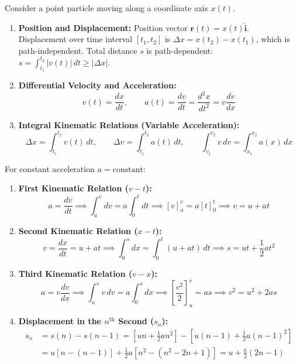 \documentclass[10pt,twoside,openright]{book}
\begin{document}
\begin{conceptbox}
Consider a point particle moving along a coordinate axis $x(t)$.
\begin{enumerate}[leftmargin=*]
  \item \textbf{Position and Displacement:} Position vector $\mathbf{r}(t) = x(t)\hat{\mathbf{i}}$. Displacement over time interval $[t_1, t_2]$ is $\Delta x = x(t_2) - x(t_1)$, which is path-independent. Total distance $s$ is path-dependent: $s = \int_{t_1}^{t_2} |v(t)|\,dt \ge |\Delta x|$.
  \item \textbf{Differential Velocity and Acceleration:}
  \begin{equation}
    v(t) = \frac{dx}{dt}, \qquad a(t) = \frac{dv}{dt} = \frac{d^2 x}{dt^2} = v\frac{dv}{dx}
  \end{equation}
  \item \textbf{Integral Kinematic Relations (Variable Acceleration):}
  \begin{equation}
    \Delta x = \int_{t_1}^{t_2} v(t)\,dt, \qquad \Delta v = \int_{t_1}^{t_2} a(t)\,dt, \qquad \int_{v_1}^{v_2} v\,dv = \int_{x_1}^{x_2} a(x)\,dx
  \end{equation}
\end{enumerate}
\end{conceptbox}

\begin{formulabox}
For constant acceleration $a = \text{constant}$:
\begin{enumerate}[leftmargin=*]
  \item \textbf{First Kinematic Relation ($v - t$):}
  \begin{equation}
    a = \frac{dv}{dt} \implies \int_{u}^{v} dv = a\int_{0}^{t} dt \implies [v]_u^v = a[t]_0^t \implies v = u + at
  \end{equation}
  \item \textbf{Second Kinematic Relation ($x - t$):}
  \begin{equation}
    v = \frac{dx}{dt} = u + at \implies \int_{0}^{s} dx = \int_{0}^{t} (u + at)\,dt \implies s = ut + \frac{1}{2}at^2
  \end{equation}
  \item \textbf{Third Kinematic Relation ($v - x$):}
  \begin{equation}
    a = v\frac{dv}{dx} \implies \int_{u}^{v} v\,dv = a\int_{0}^{s} dx \implies \left[\frac{v^2}{2}\right]_u^v = as \implies v^2 = u^2 + 2as
  \end{equation}
  \item \textbf{Displacement in the $n^{\text{th}}$ Second ($s_n$):}
  \begin{align}
    s_n &= s(n) - s(n-1) = \left[un + \frac{1}{2}an^2\right] - \left[u(n-1) + \frac{1}{2}a(n-1)^2\right] \nonumber \\
    &= u[n - (n-1)] + \frac{1}{2}a[n^2 - (n^2 - 2n + 1)] = u + \frac{a}{2}(2n - 1)
  \end{align}
\end{enumerate}
\end{formulabox}
\end{document}
